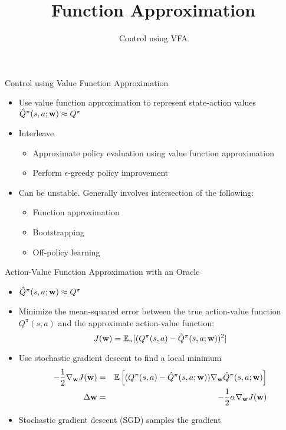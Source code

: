 \documentclass[aspectratio=169]{../latex_main/tntbeamer}  %
\title[RL: Function Approximation]{Function Approximation}
\subtitle{Control using VFA}
\begin{document}
	
	\maketitle

\begin{frame}[c]{Control using Value Function Approximation}
	
	\begin{itemize}
		\item Use value function approximation to represent state-action values $\hat{Q}^\pi(s,a;\mathbf{w}) \approx Q^\pi$
		\item Interleave
		\begin{itemize}
			\item Approximate policy evaluation using value function approximation
			\item Perform $\epsilon$-greedy policy improvement
		\end{itemize}
		\item Can be unstable. Generally involves intersection of the following:
		\begin{itemize}
			\item Function approximation
			\item Bootstrapping
			\item \alert{Off-policy learning}
		\end{itemize}
	\end{itemize}

\end{frame}
\begin{frame}[c]{Action-Value Function Approximation with an Oracle}

	\begin{itemize}
		\item $\hat{Q}^\pi(s,a;\mathbf{w}) \approx Q^\pi$
		\item Minimize the mean-squared error between the true action-value function $Q^\pi(s,a)$ and the approximate action-value function:
		$$J(\mathbf{w}) = \mathbb{E}_\pi [(Q^\pi(s,a) - \hat{Q}^\pi(s,a;\mathbf{w}))^2] $$
		\item Use stochastic gradient descent to find a local minimum
		\begin{eqnarray}
			-\frac{1}{2}\nabla_{\mathbf{w}} J(\mathbf{w}) &=& \mathbb{E}\left[ (Q^\pi(s,a) - \hat{Q}^\pi(s,a;\mathbf{w})) \nabla_{\mathbf{w}} \hat{Q}^\pi(s,a;\mathbf{w}) \right]\nonumber\\
			\Delta \mathbf{w} &=& -\frac{1}{2}\alpha\nabla_{\mathbf{w}} J(\mathbf{w})\nonumber
		\end{eqnarray}
		\item Stochastic gradient descent (SGD) samples the gradient
	\end{itemize}

\end{frame}
\end{document}
